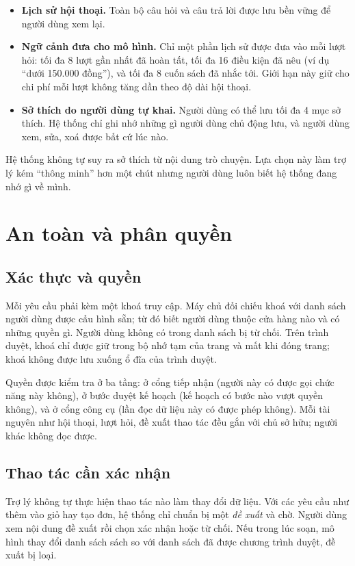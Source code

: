 \begin{itemize}
    \item \textbf{Lịch sử hội thoại.} Toàn bộ câu hỏi và câu trả lời được lưu bền vững để người dùng xem lại.
    \item \textbf{Ngữ cảnh đưa cho mô hình.} Chỉ một phần lịch sử được đưa vào mỗi lượt hỏi: tối đa 8 lượt gần nhất đã hoàn tất, tối đa 16 điều kiện đã nêu (ví dụ ``dưới 150.000 đồng''), và tối đa 8 cuốn sách đã nhắc tới. Giới hạn này giữ cho chi phí mỗi lượt không tăng dần theo độ dài hội thoại.
    \item \textbf{Sở thích do người dùng tự khai.} Người dùng có thể lưu tối đa 4 mục sở thích. Hệ thống chỉ ghi nhớ những gì người dùng chủ động lưu, và người dùng xem, sửa, xoá được bất cứ lúc nào.
\end{itemize}

Hệ thống không tự suy ra sở thích từ nội dung trò chuyện. Lựa chọn này làm trợ lý kém ``thông minh'' hơn một chút nhưng người dùng luôn biết hệ thống đang nhớ gì về mình.

\section{An toàn và phân quyền}

\subsection{Xác thực và quyền}

Mỗi yêu cầu phải kèm một khoá truy cập. Máy chủ đối chiếu khoá với danh sách người dùng được cấu hình sẵn; từ đó biết người dùng thuộc cửa hàng nào và có những quyền gì. Người dùng không có trong danh sách bị từ chối. Trên trình duyệt, khoá chỉ được giữ trong bộ nhớ tạm của trang và mất khi đóng trang; khoá không được lưu xuống ổ đĩa của trình duyệt.

Quyền được kiểm tra ở ba tầng: ở cổng tiếp nhận (người này có được gọi chức năng này không), ở bước duyệt kế hoạch (kế hoạch có bước nào vượt quyền không), và ở cổng công cụ (lần đọc dữ liệu này có được phép không). Mỗi tài nguyên như hội thoại, lượt hỏi, đề xuất thao tác đều gắn với chủ sở hữu; người khác không đọc được.

\subsection{Thao tác cần xác nhận}

Trợ lý không tự thực hiện thao tác nào làm thay đổi dữ liệu. Với các yêu cầu như thêm vào giỏ hay tạo đơn, hệ thống chỉ chuẩn bị một \emph{đề xuất} và chờ. Người dùng xem nội dung đề xuất rồi chọn xác nhận hoặc từ chối. Nếu trong lúc soạn, mô hình thay đổi danh sách sách so với danh sách đã được chương trình duyệt, đề xuất bị loại.

